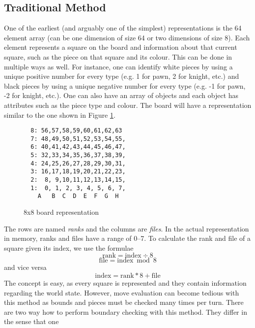 \documentclass[11pt,letterpaper,twocolumn]{article}
\begin{document}
\subsection{Traditional Method}
One of the earliest (and arguably one of the simplest) representations is the 64 element array (can be one dimension of size 64 or two dimensions of size 8).
Each element represents a square on the board and information about that current square, such as the piece on that square and its colour. This can be done in
multiple ways as well. For instance, one can identify white pieces by using a unique positive number for every type (e.g. 1 for pawn, 2 for knight, etc.) and
black pieces by using a unique negative number for every type (e.g. -1 for pawn, -2 for knight, etc.). One can also have an array of objects and each object has
attributes such as the piece type and colour. The board will have a representation similar to the one shown in Figure \ref{board8x8-rep}.
\begin{figure}[h] %
  \caption{8x8 board representation}
  \begin{verbatim}
  8: 56,57,58,59,60,61,62,63
  7: 48,49,50,51,52,53,54,55,
  6: 40,41,42,43,44,45,46,47,
  5: 32,33,34,35,36,37,38,39,
  4: 24,25,26,27,28,29,30,31,
  3: 16,17,18,19,20,21,22,23,
  2:  8, 9,10,11,12,13,14,15,
  1:  0, 1, 2, 3, 4, 5, 6, 7,
    A   B  C  D  E  F  G  H
  \end{verbatim}
  \label{board8x8-rep}
\end{figure}
The rows are named \emph{ranks} and the columns are \emph{files}. In the actual representation in memory, ranks and files have a range of 0--7. To calculate the rank
and file of a square given its index, we use the formulae
\begin{equation}
\mbox{rank} = \mbox{index} \div 8
\label{rank-formula}
\end{equation}
\begin{equation}
\mbox{file} = \mbox{index} \bmod 8
\label{file-formula}
\end{equation}
and vice versa
\begin{equation}
\mbox{index} = \mbox{rank} * 8 + \mbox{file}
\label{index-formula}
\end{equation}
The concept is easy, as every square is represented and they contain information regarding the world state. However, move evaluation can become tedious with this method
as bounds and pieces must be checked many times per turn. There are two way how to perform boundary checking with this method. They differ in the sense that one
\end{document}
